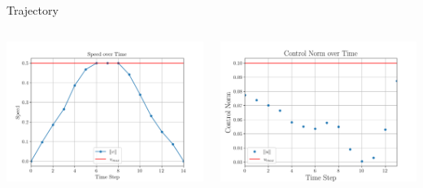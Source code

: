 \documentclass[aspectratio=169]{beamer}
\begin{document}
\begin{frame}{Trajectory}
    \vspace{-0.25cm}
    \begin{columns}[T]
        \begin{column}{.5\textwidth}
            \includegraphics[width=8cm]{img/speed.png}
        \end{column}
        \begin{column}{.5\textwidth}
            \includegraphics[width=8cm]{img/control.png}
        \end{column}
    \end{columns}
\end{frame}
\end{document}
